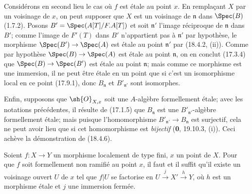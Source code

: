 Considérons en second lieu le cas où $f$ est étale au point $x$. En remplaçant $X$ par un voisinage de $x$, on peut supposer que $X$ est un voisinage de $\mathfrak n$ dans $\Spec(B)$ (1.7.2). Posons $B'=\Spec(A[T]/F.A[T])$ et soit $\mathfrak n'$ l'image réciproque de $\mathfrak n$ dans $B'$; comme l'image de $F'(T)$ dans $B'$ n'appartient pas à $\mathfrak n'$ par hypothèse, le morphisme $\Spec(B')\to\Spec(A)$ est étale au point $\mathfrak n'$ par (18.4.2, (ii)). Comme par hypothèse $\Spec(B)\to\Spec(A)$ est étale au point $\mathfrak n$, on en conclut (17.3.4) que $\Spec(B)\to\Spec(B')$ est étale au point $\mathfrak n$; mais comme ce morphisme est une immersion, il ne peut être étale en un point que si c'est un isomorphisme local en ce point (17.9.1), donc $B_{\mathfrak n}$ et $B'_{\mathfrak n'}$ sont isomorphes.

Enfin, supposons que $\sh{O}_{X,x}$ soit une $A$-algèbre formellement étale; avec les notations précédentes, il résulte de (17.1.5) que $B_{\mathfrak n}$ est une $B'_{\mathfrak n'}$-algèbre formellement étale; mais puisque l'homomorphisme $B'_{\mathfrak n'}\to B_{\mathfrak n}$ est surjectif, cela ne peut avoir lieu que si cet homomorphisme est \emph{bijectif} (\textbf{0}, 19.10.3, (i)). Ceci achève la démonstration de (18.4.6).

\begin{corollary}[18.4.7]
\label{IV.18.4.7}
Soient $f:X\to Y$ un morphisme localement de type fini, $x$ un point de $X$. Pour que $f$ soit formellement non ramifié au point $x$, il faut et il suffit qu'il existe un voisinage ouvert $U$ de $x$ tel que $f|U$ se factorise en $U\xrightarrow{j}X'\xrightarrow{h}Y$, où $h$ est un morphisme étale et $j$ une immersion fermée.
\end{corollary}


